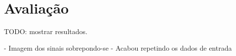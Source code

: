 \section{Avaliação}


TODO: mostrar resultados.

- Imagem dos sinais sobrepondo-se
- Acabou repetindo os dados de entrada